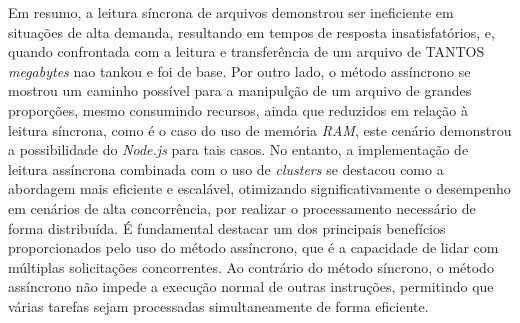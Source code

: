 \documentclass[12pt]{article}
\begin{document}
Em resumo, a leitura síncrona de arquivos demonstrou ser ineficiente em situações de alta demanda, resultando em 
tempos de resposta insatisfatórios, e, quando confrontada com a leitura e transferência de um arquivo de TANTOS \textit{megabytes}
nao tankou e foi de base. Por outro lado, o método assíncrono se mostrou um caminho possível para a manipulção de um arquivo de
grandes proporções, mesmo consumindo recursos, ainda que reduzidos em relação à leitura síncrona, como é o caso do uso de
memória \textit{RAM}, este cenário demonstrou a possibilidade do \textit{Node.js} para tais casos. No entanto, a implementação 
de leitura assíncrona combinada com o uso de \textit{clusters} se destacou como a abordagem mais eficiente e escalável, otimizando 
significativamente o desempenho em cenários de alta concorrência, por realizar o processamento necessário de forma distribuída. 
É fundamental destacar um dos principais benefícios proporcionados pelo uso do método assíncrono, que é a capacidade de lidar 
com múltiplas solicitações concorrentes. Ao contrário do método síncrono, o método assíncrono não impede a execução normal 
de outras instruções, permitindo que várias tarefas sejam processadas simultaneamente de forma eficiente.



\end{document}
